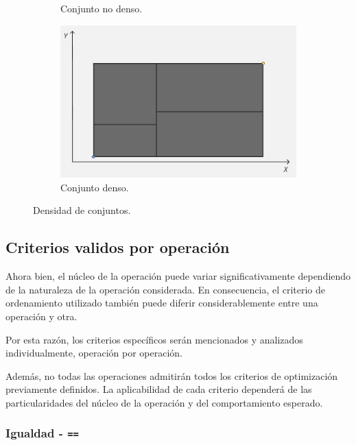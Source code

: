 \begin{figure}[h]
\begin{subfigure}[b]{0.42\linewidth}
        \caption{Conjunto no denso.}
        \label{fig:crit-suma-max}
    \end{subfigure}
    \hfill
    \vspace{0,5cm}
    \begin{subfigure}[b]{0.42\linewidth}
        \centering
        \includegraphics[width=\linewidth]{figures/optimizaciones pwmap/op simils/denso3.png}
        \caption{Conjunto denso.}
        \label{fig:crit-suma-min}
    \end{subfigure}
    \caption{Densidad de conjuntos.}
    \label{fig:crit-suma}
\end{figure}





\subsection{Criterios validos por operación}

Ahora bien, el núcleo de la operación puede variar significativamente dependiendo de la naturaleza de la operación considerada. En consecuencia, el criterio de ordenamiento utilizado también puede diferir considerablemente entre una operación y otra. 

Por esta razón, los criterios específicos serán mencionados y analizados individualmente, operación por operación. 

Además, no todas las operaciones admitirán todos los criterios de optimización previamente definidos. La aplicabilidad de cada criterio dependerá de las particularidades del núcleo de la operación y del comportamiento esperado.


\subsubsection{Igualdad - \texttt{==}}

